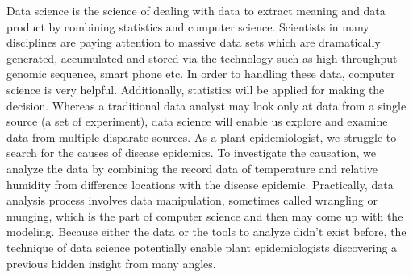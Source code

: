 \documentclass[12pt,a4paper]{article}
\begin{document}

Data science is the science of dealing with data to extract meaning and data product by combining statistics and computer science. Scientists in many disciplines are paying attention to massive data sets which are dramatically generated, accumulated and stored  via the technology such as high-throughput genomic sequence, smart phone etc. In order to handling these data, computer science is very helpful. Additionally, statistics will be applied for making the decision. Whereas a traditional data analyst may look only at data from a single source (a set of experiment), data science will enable us explore and examine data from multiple disparate sources.  As a plant epidemiologist, we struggle to search for the causes of disease epidemics. To investigate the causation, we analyze the data by combining the record data of temperature and relative humidity from difference locations with the disease epidemic. Practically, data analysis process involves data manipulation, sometimes called wrangling or munging, which is the part of computer science and then may come up with the modeling. Because either the data or the tools to analyze didn't exist before, the technique of data science potentially enable plant epidemiologists discovering a previous hidden insight from many angles.
\end{document}
